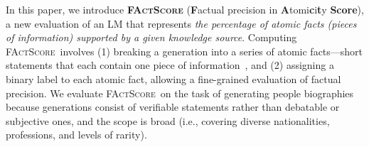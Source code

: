 \documentclass[11pt]{article}
\newcommand{\ours}{\textsc{FActScore}}
\newcommand{\ourslong}{\textbf{F}actual precision in \textbf{A}tomi\textbf{c}i\textbf{t}y \textbf{Score}}
\newcommand{\kalpesh}[1]{\textcolor{brown}{[Kalpesh: #1]}
}
\newcommand{\mohit}[1]{\textcolor{blue}{[Mohit: #1]}
}
\newcommand{\pw}[1]{%
}
\begin{document}
In this paper, we introduce \textbf{\ours} (\ourslong), a new evaluation of an LM that represents {\em the percentage of atomic facts (pieces of information) supported by a given knowledge source}.
%
Computing \ours\ involves
(1) breaking a generation into a series of atomic facts---short statements that each contain one piece of information~\citep{nenkova2004evaluating,shapira-etal-2019-crowdsourcing,zhang-bansal-2021-finding,liu2022revisiting}, and (2) assigning a binary label %
to each atomic fact, allowing a fine-grained evaluation of factual precision.
%
We evaluate \ours\ on the task of generating people biographies because
generations
consist of verifiable statements rather than debatable or subjective ones,
and the scope is broad
(i.e., covering diverse nationalities, professions, and levels of rarity). %
\end{document}
